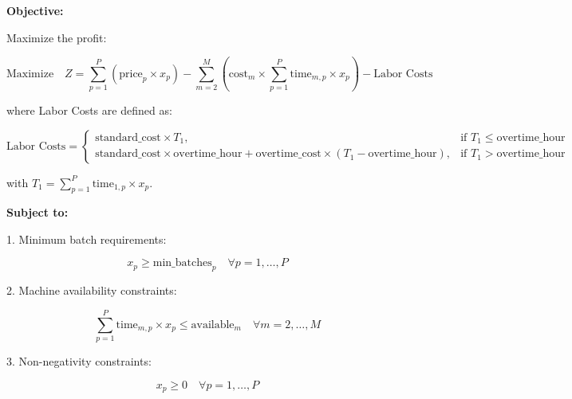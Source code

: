 \documentclass{article}
\begin{document}
\textbf{Objective:}

Maximize the profit:

\[
\text{Maximize} \quad Z = \sum_{p=1}^{P} \left( \text{price}_p \times x_p \right) - \sum_{m=2}^{M} \left( \text{cost}_m \times \sum_{p=1}^{P} \text{time}_{m,p} \times x_p \right) - \text{Labor Costs}
\]

where Labor Costs are defined as:

\[
\text{Labor Costs} = 
\begin{cases} 
\text{standard\_cost} \times T_1, & \text{if } T_1 \leq \text{overtime\_hour} \\
\text{standard\_cost} \times \text{overtime\_hour} + \text{overtime\_cost} \times (T_1 - \text{overtime\_hour}), & \text{if } T_1 > \text{overtime\_hour}
\end{cases}
\]

with \( T_1 = \sum_{p=1}^{P} \text{time}_{1,p} \times x_p \).

\textbf{Subject to:}

1. Minimum batch requirements:

\[
x_p \geq \text{min\_batches}_p \quad \forall p = 1, \ldots, P
\]

2. Machine availability constraints:

\[
\sum_{p=1}^{P} \text{time}_{m,p} \times x_p \leq \text{available}_m \quad \forall m = 2, \ldots, M
\]

3. Non-negativity constraints:

\[
x_p \geq 0 \quad \forall p = 1, \ldots, P
\]
\end{document}
